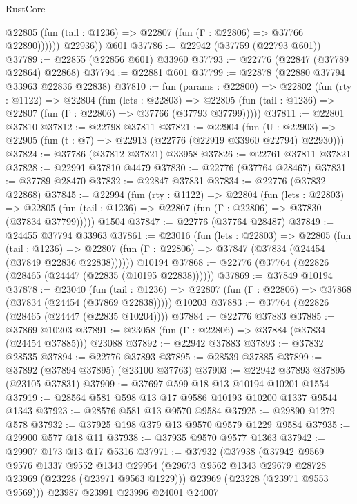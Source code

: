 \begin{lexlean}{RustCore}
\begin{coremodule}
              @22805 (fun (tail : @1236) => @22807 (fun (Γ : @22806) => @37766 @22890))))))
        @22936))
    @601
@37786 := @22942 (@37759 (@22793 @601))
@37789 := @22855 (@22856 @601) @33960
@37793 := @22776 (@22847 (@37789 @22864) @22868)
@37794 := @22881 @601
@37799 := @22878 (@22880 @37794 @33963 @22836 @22838)
@37810 := fun (params : @22800) =>
  @22802
    (fun (rty : @1122) =>
    @22804
      (fun (lets : @22803) =>
      @22805 (fun (tail : @1236) => @22807 (fun (Γ : @22806) => @37766 (@37793 @37799)))))
@37811 := @22801 @37810
@37812 := @22798 @37811
@37821 := @22904
    (fun (U : @22903) => @22905 (fun (t : @7) => @22913 (@22776 (@22919 @33960 @22794) @22930)))
@37824 := @37786 (@37812 @37821) @33958
@37826 := @22761 @37811 @37821
@37828 := @22991 @37810 @4479
@37830 := @22776 (@37764 @28467)
@37831 := @37789 @28470
@37832 := @22847 @37831
@37834 := @22776 (@37832 @22868)
@37845 := @22994
    (fun (rty : @1122) =>
    @22804
      (fun (lets : @22803) =>
      @22805 (fun (tail : @1236) => @22807 (fun (Γ : @22806) => @37830 (@37834 @37799)))))
    @1504
@37847 := @22776 (@37764 @28487)
@37849 := @24455 @37794 @33963
@37861 := @23016
    (fun (lets : @22803) =>
    @22805
      (fun (tail : @1236) =>
      @22807 (fun (Γ : @22806) => @37847 (@37834 (@24454 (@37849 @22836 @22838))))))
    @10194
@37868 := @22776 (@37764 (@22826 (@28465 (@24447 (@22835 (@10195 @22838))))))
@37869 := @37849 @10194
@37878 := @23040
    (fun (tail : @1236) => @22807 (fun (Γ : @22806) => @37868 (@37834 (@24454 (@37869 @22838)))))
    @10203
@37883 := @37764 (@22826 (@28465 (@24447 (@22835 @10204))))
@37884 := @22776 @37883
@37885 := @37869 @10203
@37891 := @23058 (fun (Γ : @22806) => @37884 (@37834 (@24454 @37885))) @23088
@37892 := @22942 @37883
@37893 := @37832 @28535
@37894 := @22776 @37893
@37895 := @28539 @37885
@37899 := @37892 (@37894 @37895) (@23100 @37763)
@37903 := @22942 @37893 @37895 (@23105 @37831)
@37909 := @37697 @599 @18 @13 @10194 @10201 @1554
@37919 := @28564 @581 @598 @13 @17 @9586 @10193 @10200 @1337 @9544 @1343
@37923 := @28576 @581 @13 @9570 @9584
@37925 := @29890 @1279 @578
@37932 := @37925 @198 @379 @13 @9570 @9579 @1229 @9584
@37935 := @29900 @577 @18 @11
@37938 := @37935 @9570 @9577 @1363
@37942 := @29907 @173 @13 @17 @5316
@37971 := @37932
    (@37938
      (@37942
        @9569
        @9576
        @1337
        @9552
        @1343
        @29954
        (@29673 @9562 @1343 @29679 @28728 @23969 (@23228 (@23971 @9563 @1229)))
        @23969
        (@23228 (@23971 @9553 @9569)))
      @23987
      @23991
      @23996
      @24001
      @24007

\end{coremodule}
\end{lexlean}
